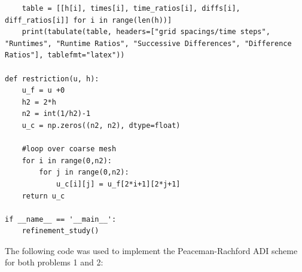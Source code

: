 \documentclass[12pt]{article}
\begin{document}
\begin{verbatim}
    table = [[h[i], times[i], time_ratios[i], diffs[i], diff_ratios[i]] for i in range(len(h))]
    print(tabulate(table, headers=["grid spacings/time steps", "Runtimes", "Runtime Ratios", "Successive Differences", "Difference Ratios"], tablefmt="latex"))

def restriction(u, h):
    u_f = u +0
    h2 = 2*h
    n2 = int(1/h2)-1
    u_c = np.zeros((n2, n2), dtype=float)

    #loop over coarse mesh
    for i in range(0,n2):
        for j in range(0,n2):
            u_c[i][j] = u_f[2*i+1][2*j+1]
    return u_c

if __name__ == '__main__':
    refinement_study()  
\end{verbatim}

The following code was used to implement the Peaceman-Rachford ADI scheme for both problems 1 and 2:
\end{document}
